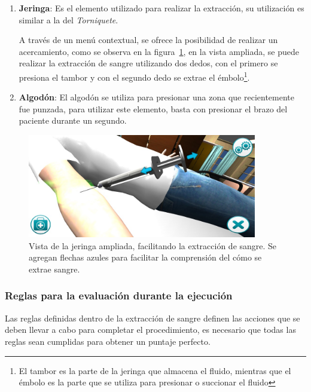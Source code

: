 \begin{itemize}
\begin{enumerate}
\item \textbf{Jeringa}: Es el elemento utilizado para realizar la extracción, su
    utilización es similar a la del \emph{Torniquete}.

    A través de un menú contextual, se ofrece la posibilidad de realizar un
    acercamiento, como se observa en la figura~\ref{fig:hemocultivo_jeringa_zoom}, 
    en la vista ampliada, se puede realizar la extracción de sangre utilizando dos dedos, 
    con el primero se presiona el tambor y con el segundo dedo se extrae el émbolo\footnote{El
    tambor es la parte de la jeringa que almacena el fluido, mientras que el
    émbolo es la parte que se utiliza para presionar o succionar el fluido}.
    
\item \textbf{Algodón}: El algodón se utiliza para presionar una zona que
    recientemente fue punzada, para utilizar este elemento, basta con presionar
    el brazo del paciente durante un segundo.

\end{enumerate}


\begin{figure}[H]
\centering 
\includegraphics[width=10cm]{solucion/images/hemocultivo_jeringa_ampliada.jpg}
\caption{Vista de la jeringa ampliada, facilitando la extracción de sangre. Se
    agregan flechas azules para facilitar la comprensión del cómo se extrae
    sangre.}
\label{fig:hemocultivo_jeringa_zoom}
\end{figure}

\end{itemize}

\subsubsection{Reglas para la evaluación durante la ejecución}

Las reglas definidas dentro de la extracción de sangre definen las acciones
que se deben llevar a cabo para completar el procedimiento, es necesario que
todas las reglas sean cumplidas para obtener un puntaje perfecto.


